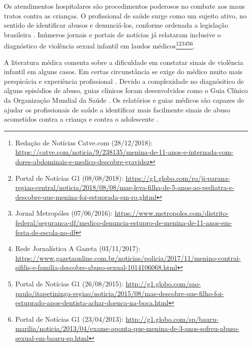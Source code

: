 Os atendimentos hospitalares são procedimentos poderosos no combate aos maus tratos contra as crianças. O profissional de saúde surge como um sujeito ativo, no sentido de identificar abusos e denunciá-los, conforme ordenada a legislação brasileira \cite{costa2019maus}. Inúmeros jornais e portais de notícias já relataram inclusive o diagnóstico de violência sexual infantil em laudos médicos\footnote{Redação de Notícias Catve.com (28/12/2018): \url{https://catve.com/noticia/9/238135/menina-de-11-anos-e-internada-com-dores-abdominais-e-medico-descobre-gravidez}}\footnote{Portal de Notícias G1 (08/08/2018): \url{https://g1.globo.com/ro/ji-parana-regiao-central/noticia/2018/08/08/mae-leva-filha-de-5-anos-ao-pediatra-e-descobre-que-menina-foi-estuprada-em-ro.ghtml}}\footnote{Jornal Metropóles (07/06/2016): \url{https://www.metropoles.com/distrito-federal/seguranca-df/medico-denuncia-estupro-de-menina-de-11-anos-em-festa-de-escola-no-df}}\footnote{Rede Jornalística A Gazeta (03/11/2017): \url{https://www.gazetaonline.com.br/noticias/policia/2017/11/menino-contrai-sifilis-e-familia-descobre-abuso-sexual-1014106068.html}}\footnote{Portal de Notícias G1 (26/08/2015): \url{http://g1.globo.com/sao-paulo/itapetininga-regiao/noticia/2015/08/mae-descobre-que-filho-foi-estuprado-apos-dentista-achar-doenca-na-boca.html}}\footnote{Portal de Notícias G1 (23/04/2013): \url{http://g1.globo.com/sp/bauru-marilia/noticia/2013/04/exame-aponta-que-menina-de-3-anos-sofreu-abuso-sexual-em-bauru-sp.html}}.%



A literatura médica comenta sobre a dificuldade em constatar sinais de violência infantil em alguns casos. Em certas circunstância se exige do médico muito mais perspicácia e experiência profissional \cite{de2012violencia}. Devido a complexidade no diagnósitico de alguns episódios de abuso, guias clínicos foram desenvolvidos como o Guia Clínico da Organização Mundial da Saúde \cite{world2017responding}. Os relatórios e guias médicos são capazes de ajudar os profissionais de saúde a identificar mais facilmente sinais de abuso acometidos contra a criança e contra o adolescente \cite{Christian1}.

